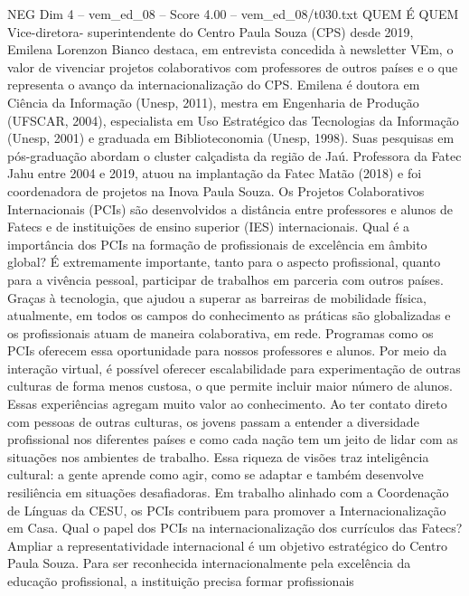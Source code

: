 \begin{textsample}{NEG Dim 4 – vem\_ed\_08 – Score 4.00 – vem\_ed\_08/t030.txt}  \label{ex:f4_neg_030}
QUEM É QUEM Vice-diretora- superintendente do Centro Paula Souza (CPS) desde 2019, Emilena Lorenzon Bianco destaca, em entrevista concedida à newsletter VEm, o valor de vivenciar projetos colaborativos com professores de outros países e o que representa o avanço da internacionalização do CPS.
Emilena é doutora em Ciência da Informação (Unesp, 2011), mestra em Engenharia de Produção (UFSCAR, 2004), especialista em Uso Estratégico das Tecnologias da Informação (Unesp, 2001) e graduada em Biblioteconomia (Unesp, 1998).
Suas pesquisas em pós-graduação abordam o cluster calçadista da região de Jaú.
Professora da Fatec Jahu entre 2004 e 2019, atuou na implantação da Fatec Matão (2018) e foi coordenadora de projetos na Inova Paula Souza.
Os Projetos Colaborativos Internacionais (PCIs) são desenvolvidos a distância entre professores e alunos de Fatecs e de instituições de ensino superior (IES) internacionais.
Qual é a importância dos PCIs na formação de profissionais de excelência em âmbito global?
É extremamente importante, tanto para o aspecto profissional, quanto para a vivência pessoal, participar de trabalhos em parceria com outros países.
Graças à tecnologia, que ajudou a superar as barreiras de mobilidade física, atualmente, em todos os campos do conhecimento as práticas são globalizadas e os profissionais atuam de maneira colaborativa, em rede.
Programas como os PCIs oferecem essa oportunidade para nossos professores e alunos.
Por meio da interação virtual, é possível oferecer escalabilidade para experimentação de outras culturas de forma menos custosa, o que permite incluir maior número de alunos.
Essas experiências agregam muito valor ao conhecimento.
Ao ter contato direto com pessoas de outras culturas, os jovens passam a entender a diversidade profissional nos diferentes países e como cada nação tem um jeito de lidar com as situações nos ambientes de trabalho.
Essa riqueza de visões traz inteligência cultural: a gente aprende como agir, como se adaptar e também desenvolve resiliência em situações desafiadoras.
Em trabalho alinhado com a Coordenação de Línguas da CESU, os PCIs contribuem para promover a Internacionalização em Casa.
Qual o papel dos PCIs na internacionalização dos currículos das Fatecs?
Ampliar a representatividade internacional é um objetivo estratégico do Centro Paula Souza.
Para ser reconhecida internacionalmente pela excelência da educação profissional, a instituição precisa formar profissionais

\end{textsample}
